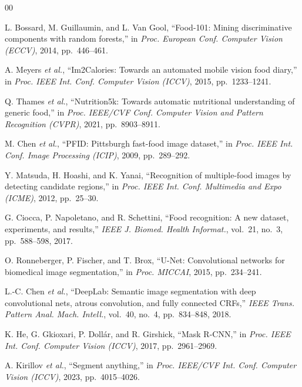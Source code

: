\documentclass[conference]{IEEEtran}
\begin{document}
\begin{thebibliography}{00}

L. Bossard, M. Guillaumin, and L. Van Gool,
``Food-101: Mining discriminative components with random forests,''
in \textit{Proc. European Conf. Computer Vision (ECCV)}, 2014, pp.~446--461.

A. Meyers \textit{et al.},
``Im2Calories: Towards an automated mobile vision food diary,''
in \textit{Proc. IEEE Int. Conf. Computer Vision (ICCV)}, 2015, pp.~1233--1241.

Q. Thames \textit{et al.},
``Nutrition5k: Towards automatic nutritional understanding of generic food,''
in \textit{Proc. IEEE/CVF Conf. Computer Vision and Pattern Recognition (CVPR)},
2021, pp.~8903--8911.

M. Chen \textit{et al.},
``PFID: Pittsburgh fast-food image dataset,''
in \textit{Proc. IEEE Int. Conf. Image Processing (ICIP)}, 2009, pp.~289--292.

Y. Matsuda, H. Hoashi, and K. Yanai,
``Recognition of multiple-food images by detecting candidate regions,''
in \textit{Proc. IEEE Int. Conf. Multimedia and Expo (ICME)}, 2012, pp.~25--30.

G. Ciocca, P. Napoletano, and R. Schettini,
``Food recognition: A new dataset, experiments, and results,''
\textit{IEEE J. Biomed. Health Informat.}, vol.~21, no.~3, pp.~588--598, 2017.

O. Ronneberger, P. Fischer, and T. Brox,
``U-Net: Convolutional networks for biomedical image segmentation,''
in \textit{Proc. MICCAI}, 2015, pp.~234--241.

L.-C. Chen \textit{et al.},
``DeepLab: Semantic image segmentation with deep convolutional nets, atrous convolution,
and fully connected CRFs,''
\textit{IEEE Trans. Pattern Anal. Mach. Intell.}, vol.~40, no.~4, pp.~834--848, 2018.

K. He, G. Gkioxari, P. Doll\'ar, and R. Girshick,
``Mask R-CNN,''
in \textit{Proc. IEEE Int. Conf. Computer Vision (ICCV)}, 2017, pp.~2961--2969.

A. Kirillov \textit{et al.},
``Segment anything,''
in \textit{Proc. IEEE/CVF Int. Conf. Computer Vision (ICCV)}, 2023, pp.~4015--4026.


\end{thebibliography}
\end{document}
